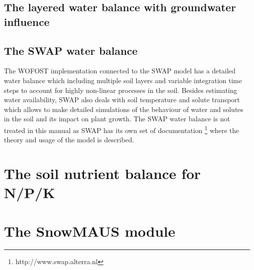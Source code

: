 \subsection{The layered water balance with groundwater influence}

\subsection{The SWAP water balance}

The WOFOST implementation connected to the SWAP model has a detailed water balance which including 
multiple soil layers and variable integration time steps to account for highly non-linear processes 
in the soil. Besides estimating water availability, SWAP also deals with soil temperature and solute 
transport which allows to make 
detailed simulations of the behaviour of water and solutes in the soil and its impact on plant growth.
The SWAP water balance is not treated in this manual as SWAP has its own set of documentation 
\footnote{http://www.swap.alterra.nl} where the theory and usage of the model is described.

\section{The soil nutrient balance for N/P/K}


\section{The SnowMAUS module}

